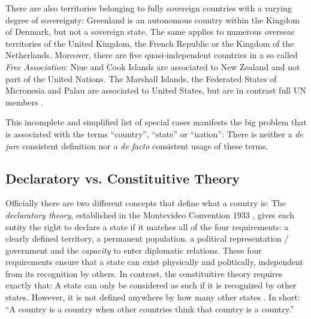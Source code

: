 There are also territories belonging to fully sovereign countries with a varying degree of sovereignty: Greenland is an autonomous country within the Kingdom of Denmark, but not a sovereign state. The same applies to numerous overseas territories of the United Kingdom, the French Republic or the Kingdom of the Netherlands. Moreover, there are five quasi-independent countries in a so called \emph{Free Association}: Niue and Cook Islands are associated to New Zealand and not part of the United Nations. The Marshall Islands, the Federated States of Micronesia and Palau are associated to United States, but are in contrast full UN members \cite{SpecialTerritories}.


This incomplete and simplified list of special cases manifests the big problem that is associated with the terms ``country'', ``state'' or ``nation'': There is neither a \emph{de jure} consistent definition nor a \emph{de facto} consistent usage of these terms.


\subsection{Declaratory vs. Constituitive Theory} %
\label{sub:declaratory_vs_constituitive_theory}

Officially there are two different concepts that define what a country is: The \emph{declaratory theory}, established in the Montevideo Convention 1933 \cite{MontevideoConvention}, gives each entity the right to declare a state if it matches all of the four requirements: a clearly defined territory, a permanent population. a political representation / government and the \emph{capacity} to enter diplomatic relations. These four requirements ensure that a state can exist physically and politically, independent from its recognition by others.
In contrast, the constituitive theory requires exactly that: A state can only be considered as such if it is recognized by other states. However, it is not defined anywhere by how many other states \cite{StateTheory}. In short: ``A country is a country when other countries think that country is a country.'' \cite{greyCountries}

